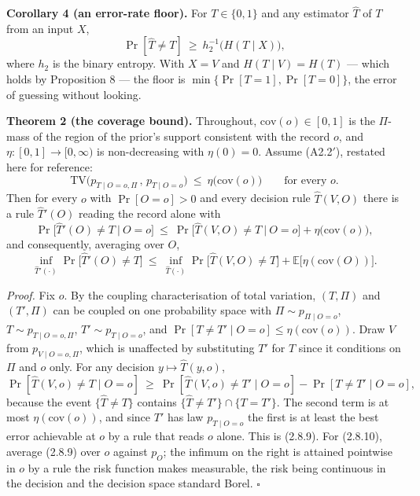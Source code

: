 \documentclass[11pt,a4paper]{article}
\begin{document}
\textbf{Corollary 4 (an error-rate floor).} For \(T\in\{0,1\}\) and any estimator
\(\hat T\) of \(T\) from an input \(X\),
\begin{equation}
\Pr[\hat T\ne T]\ \ge\ h_2^{-1}\big(H(T\mid X)\big),
\tag{2.8.8}
\end{equation}
where \(h_2\) is the binary entropy. With \(X=V\) and \(H(T\mid V)=H(T)\) --- which holds
by Proposition 8 --- the floor is \(\min\{\Pr[T=1],\Pr[T=0]\}\), the error of
guessing without looking.

\textbf{Theorem 2 (the coverage bound).} Throughout, \(\mathrm{cov}(o)\in[0,1]\) is the
\(\Pi\)-mass of the region of the prior's support consistent with the record \(o\), and
\(\eta:[0,1]\to[0,\infty)\) is non-decreasing with \(\eta(0)=0\). Assume (A2.2\('\)),
restated here for reference:
\[
\mathrm{TV}\Big(p_{T\mid O=o,\Pi}\,,\,p_{T\mid O=o}\Big)\ \le\ \eta\big(\mathrm{cov}(o)\big)
\qquad\text{for every }o .
\]
Then for every \(o\) with \(\Pr[O=o]>0\) and every decision rule \(\hat T(V,O)\) there is
a rule \(\hat T'(O)\) reading the record alone with
\begin{equation}
\Pr\big[\hat T'(O)\ne T\ \big|\ O=o\big]
\ \le\
\Pr\big[\hat T(V,O)\ne T\ \big|\ O=o\big]+\eta\big(\mathrm{cov}(o)\big),
\tag{2.8.9}
\end{equation}
and consequently, averaging over \(O\),
\begin{equation}
\inf_{\hat T'(\cdot)}\Pr\big[\hat T'(O)\ne T\big]
\ \le\
\inf_{\hat T(\cdot)}\Pr\big[\hat T(V,O)\ne T\big]
+\mathbb E\big[\eta(\mathrm{cov}(O))\big].
\tag{2.8.10}
\end{equation}

\emph{Proof.} Fix \(o\). By the coupling characterisation of total variation, \((T,\Pi)\)
and \((T',\Pi)\) can be coupled on one probability space with \(\Pi\sim p_{\Pi\mid O=o}\),
\(T\sim p_{T\mid O=o,\Pi}\), \(T'\sim p_{T\mid O=o}\), and \(\Pr[T\ne T'\mid O=o]\le\eta(\mathrm{cov}(o))\).
Draw \(V\) from \(p_{V\mid O=o,\Pi}\), which is unaffected by substituting \(T'\) for \(T\)
since it conditions on \(\Pi\) and \(o\) only. For any decision \(y\mapsto\hat T(y,o)\),
\[
\Pr[\hat T(V,o)\ne T\mid O=o]
\ \ge\ \Pr[\hat T(V,o)\ne T'\mid O=o]-\Pr[T\ne T'\mid O=o],
\]
because the event \(\{\hat T\ne T\}\) contains \(\{\hat T\ne T'\}\cap\{T=T'\}\). The
second term is at most \(\eta(\mathrm{cov}(o))\), and since \(T'\) has law
\(p_{T\mid O=o}\) the first is at least the best error achievable at \(o\) by a rule
that reads \(o\) alone. This is (2.8.9). For (2.8.10), average (2.8.9) over \(o\)
against \(p_O\); the infimum on the right is attained pointwise in \(o\) by a rule the
risk function makes measurable, the risk being continuous in the decision and the
decision space standard Borel. \(\square\)
\end{document}
